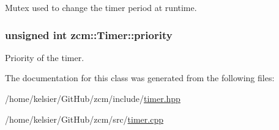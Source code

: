 Mutex used to change the timer period at runtime. 

\hypertarget{classzcm_1_1Timer_a722f6390254d106117d8e1545b6092ab}{
\subsubsection[{priority}]{\setlength{\rightskip}{0pt plus 5cm}unsigned int zcm\-::\-Timer\-::priority\hspace{0.3cm}{\ttfamily [private]}}}\label{classzcm_1_1Timer_a722f6390254d106117d8e1545b6092ab}


Priority of the timer. 



The documentation for this class was generated from the following files\-:\begin{DoxyCompactItemize}
\item 
/home/kelsier/\-Git\-Hub/zcm/include/\hyperlink{timer_8hpp}{timer.\-hpp}\item 
/home/kelsier/\-Git\-Hub/zcm/src/\hyperlink{timer_8cpp}{timer.\-cpp}\end{DoxyCompactItemize}
